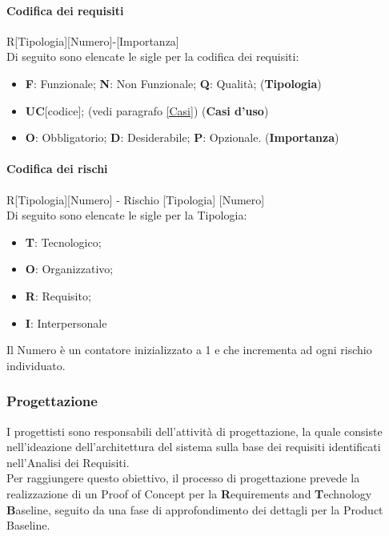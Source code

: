 \paragraph{Codifica dei requisiti}

R[Tipologia][Numero]-[Importanza] \\
Di seguito sono elencate le sigle per la codifica dei requisiti: 
\begin{itemize}
    \item \textbf{F}: Funzionale; \textbf{N}: Non Funzionale; \textbf{Q}: Qualità; (\textbf{Tipologia})
    \item \textbf{UC}[codice]; (vedi paragrafo \ref{Casi}) (\textbf{Casi d'uso})
    \item \textbf{O}: Obbligatorio; \textbf{D}: Desiderabile; \textbf{P}: Opzionale. (\textbf{Importanza})
\end{itemize}

\paragraph{Codifica dei rischi}\label{codRischi}

R[Tipologia][Numero] - Rischio [Tipologia] [Numero] \\
Di seguito sono elencate le sigle per la Tipologia: 
\begin{itemize}
    \item \textbf{T}: Tecnologico;
    \item \textbf{O}: Organizzativo;
    \item \textbf{R}: Requisito;
    \item \textbf{I}: Interpersonale
\end{itemize}
Il Numero è un contatore inizializzato a 1 e che incrementa ad ogni rischio individuato.

\subsubsection{Progettazione}\label{Prog}
I progettisti sono responsabili dell'attività di progettazione, la quale consiste nell'ideazione dell'architettura del sistema sulla base dei requisiti 
identificati nell'Analisi dei Requisiti. \\
Per raggiungere questo obiettivo, il processo di progettazione prevede la realizzazione di un Proof of Concept\glo 
per la \textbf{R}equirements and \textbf{T}echnology \textbf{B}aseline, seguito da una fase di approfondimento dei dettagli per la Product Baseline.


